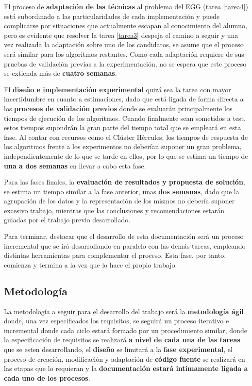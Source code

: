 El proceso de \textbf{adaptación de las técnicas} al problema del EGG (tarea \ref{tarea4}) está subordinado a las particularidades de cada implementación y puede complicarse por situaciones que actualmente escapan al conocimiento del alumno, pero es evidente que resolver la tarea \ref{tarea3} despeja el camino a seguir y una vez realizada la adaptación sobre uno de los candidatos, se asume que el proceso será similar para los algoritmos restantes. Como cada adaptación requiere de sus pruebas de validación previas a la experimentación, no se espera que este proceso se extienda más de \textbf{cuatro semanas}. 

El \textbf{diseño e implementación experimental} quizá sea la tarea con mayor incertidumbre en cuanto a estimaciones, dado que está ligada de forma directa a los \textbf{procesos de validación previos} donde se evaluarán principalmente los tiempos de ejecución de los algoritmos. Cuando finalmente sean sometidos a test, estos tiempos supondrán la gran parte del tiempo total que se empleará en esta fase. Al contar con recursos como el Clúster Hércules, los tiempos de respuesta de los algoritmos frente a los experimentos no deberían suponer un gran problema, independientemente de lo que se tarde en ellos, por lo que se estima un tiempo de \textbf{una a dos semanas} en llevar a cabo esta fase.

Para las fases finales, la \textbf{evaluación de resultados y propuesta de solución}, se estima un tiempo similar a la fase anterior, unas \textbf{dos semanas}, dado que la agrupación de los datos y la representación de los mismos no debería suponer excesivo trabajo, mientras que las conclusiones y recomendaciones estarán guiadas por el trabajo previo desarrollado.

Para terminar, destacar que el desarrollo de esta documentación será un proceso incremental que se irá desarrollando en paralelo con las demás tareas, empleando distintas herramientas para complementar el proceso. Esta fase, por tanto, comienza y termina a la vez que lo hace el propio trabajo.

\subsection{Metodología}

La metodología a seguir para el desarrollo del trabajo será la \textbf{metodología ágil} donde, una vez especificados los requisitos, se seguirá un proceso iterativo e incremental donde cada ciclo estará formado por un procedimiento similar, donde la especificación de requisitos se realizará \textbf{a nivel de cada una de las tareas} que se esten desarrollando, el \textbf{diseño} se limitará a la \textbf{fase experimental}, el proceso de creación, modificación y adaptación de \textbf{código fuente} se realizará en las etapas que lo requieran y la \textbf{documentación estará intimamente ligada a cada uno de los procesos}.

